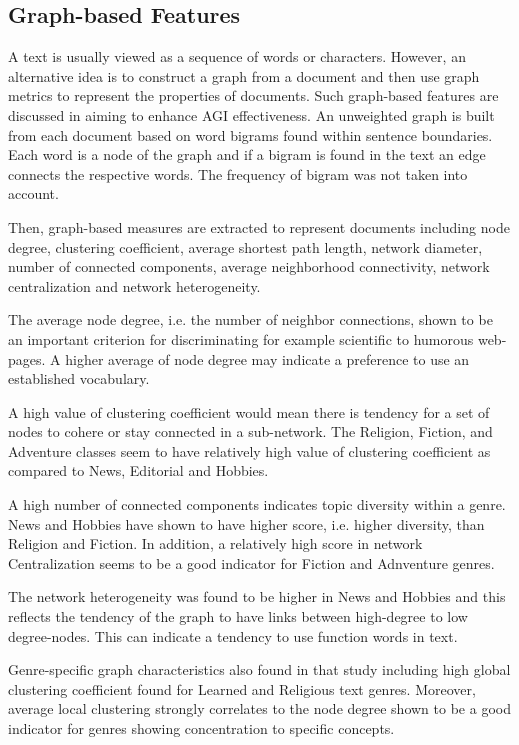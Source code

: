 \subsection{Graph-based Features} 

A text is usually viewed as a sequence of words or characters. However, an alternative idea is to construct a graph from a document and then use graph metrics to represent the properties of documents. Such graph-based features are discussed in \parencite{nabhan2016graph} aiming to enhance AGI effectiveness. An unweighted graph is built from each document based on word bigrams found within sentence boundaries. Each word is a node of the graph and if a bigram is found in the text an edge connects the respective words. The frequency of bigram was not taken into account. 

Then, graph-based measures are extracted to represent documents including node degree, clustering coefficient, average shortest path length, network diameter, number of connected components, average neighborhood connectivity, network centralization and network heterogeneity.  

The average node degree, i.e. the number of neighbor connections, shown  to be an important criterion for discriminating for example scientific to humorous web-pages. A higher average of node degree may indicate a preference to use an established vocabulary.

A high value of clustering coefficient would mean there is tendency for a set of nodes to cohere or stay connected in a sub-network. The Religion, Fiction, and Adventure classes seem to have relatively high value of clustering coefficient as compared to News, Editorial and Hobbies. 

A high number of connected components indicates topic diversity within a genre. News and Hobbies have shown to have higher score, i.e. higher diversity, than Religion and Fiction. In addition, a relatively high score in network Centralization seems to be a good indicator for Fiction and Adnventure genres.

The network heterogeneity was found to be higher in News and Hobbies and this reflects the tendency of the graph to have links between high-degree to low degree-nodes. This can indicate a tendency to use function words in text.

Genre-specific graph characteristics also found in that study \parencite{nabhan2016graph} including high global clustering coefficient found for Learned and Religious text genres. Moreover, average local clustering strongly correlates to the node degree shown to be a good indicator for genres showing concentration to specific concepts.

